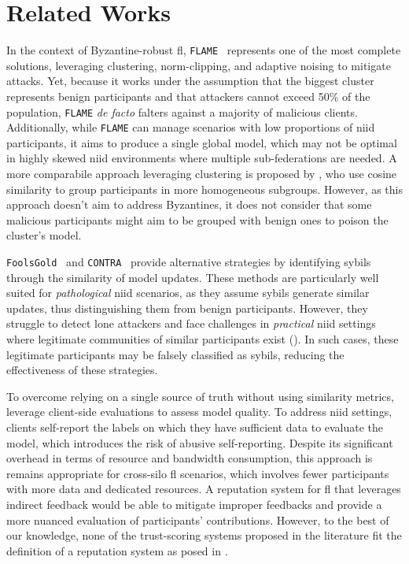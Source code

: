 \section{Related Works\label{sec:radar.related}}

In the context of Byzantine-robust \gls{fl}, \texttt{FLAME}~\cite{nguyen_FLAMETamingBackdoors_2022} represents one of the most complete solutions, leveraging clustering, norm-clipping, and adaptive noising to mitigate attacks.
Yet, because it works under the assumption that the biggest cluster represents benign participants and that attackers cannot exceed 50\% of the population, \texttt{FLAME} \emph{de facto} falters against a majority of malicious clients.
Additionally, while \texttt{FLAME} can manage scenarios with low proportions of \gls{niid} participants, it aims to produce a single global model, which may not be optimal in highly skewed \gls{niid} environments where multiple sub-federations are needed.
A more comparabile approach leveraging clustering is proposed by \textcite{ye_PFedSAPersonalizedFederated_2023}, who use cosine similarity to group participants in more homogeneous subgroups.
However, as this approach doesn't aim to address Byzantines, it does not consider that some malicious participants might aim to be grouped with benign ones to poison the cluster's model.

\texttt{FoolsGold}~\cite{fung_LimitationsFederatedLearning_2020} and \texttt{CONTRA}~\cite{awan_CONTRADefendingPoisoning_2021} provide alternative strategies by identifying sybils through the similarity of model updates.
These methods are particularly well suited for \emph{pathological} \gls{niid} scenarios, as they assume sybils generate similar updates, thus distinguishing them from benign participants.
However, they struggle to detect lone attackers and face challenges in \emph{practical} \gls{niid} settings where legitimate communities of similar participants exist (\cf {}).
In such cases, these legitimate participants may be falsely classified as sybils, reducing the effectiveness of these strategies.

To overcome relying on a single source of truth without using similarity metrics, \textcite{zhao_ShieldingCollaborativeLearning_2020} leverage client-side evaluations to assess model quality.
To address \gls{niid} settings, clients self-report the labels on which they have sufficient data to evaluate the model, which introduces the risk of abusive self-reporting.
Despite its significant overhead in terms of resource and bandwidth consumption, this approach is remains appropriate for cross-silo \gls{fl} scenarios, which involves fewer participants with more data and dedicated resources.
A reputation system for \gls{fl} that leverages indirect feedback would be able to mitigate improper feedbacks and provide a more nuanced evaluation of participants' contributions.
However, to the best of our knowledge, none of the trust-scoring systems proposed in the literature fit the definition of a reputation system as posed in .
